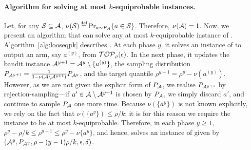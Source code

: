 
\paragraph{Algorithm for solving at most $k$-equiprobable \protect\QPK instances.} Let, for any $\mathcal{S} \subseteq \mathcal{A}$, $\nu(\mathcal{S}) \defeq \Pr_{a \sim P_\A}\{a \in \mathcal{S}\}$. Therefore, $\nu(\mathcal{A}) = 1$.
Now, we present an algorithm \KQP that can solve any at most $k$-equiprobable instance of \QPK. 
Algorithm~\ref{alg:looseqpk} describes \KQP.
At each phase $y$, it solves an instance of \QP to output an arm, say $a^{(y)}$, from ${\mathcal{TOP}_\rho}(\epsilon)$. In
the next phase, it updates the bandit instance $\mathcal{A}^{y+1} = \mathcal{A}^{y}\setminus\{a^{(y)}\}$,
the sampling distribution 
$P_{\mathcal{A}^{y+1}} = \frac{1}{1-\nu\left(\mathcal{A}\setminus\mathcal{A}^{y+1}\right)} P_{\mathcal{A}^{y}}$, and the target quantile $\rho^{y+1} = \rho^y-\nu(a^{(y)})$. However, as we
are not given the explicit form of $P_{\mathcal{A}}$, we realise $P_{\mathcal{A}^{y+1}}$ by rejection-sampling---if
$a' \in \mathcal{A}\setminus\mathcal{A}^{y+1}$ is chosen by $P_{\mathcal{A}}$, we simply discard $a'$, and
continue to sample $P_{\mathcal{A}}$ one more time. Because $\nu(\{a^y\})$ is not known explicitly,
we rely on the fact that $\nu(\{a^y\}) \leq \rho/k$: it is for this reason we require the instance to be at most $ k$-equiprobable.
Therefore, in each phase $y \geq 1$, $\rho^y - \rho/k \leq \rho^{y+1} \leq \rho^y - \nu\{a^y\}$, and hence,
\KQP solves an instance of \QP given by 
$\left(\mathcal{A}^{y}, P_{\mathcal{A}^{y}}, \rho-{(y-1)\rho}/{k}, \epsilon, \delta\right)$.


